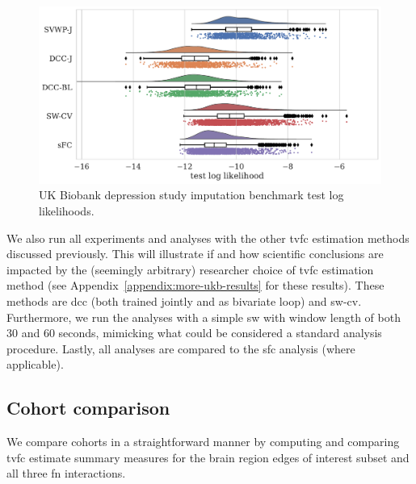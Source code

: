 \begin{figure}[ht]
  \centering
  \includegraphics[width=\textwidth]{fig/ukbiobank/imputation_study/ROI/LEOO_test_log_likelihoods_raincloud}
  \caption{
    UK Biobank depression study imputation benchmark test log likelihoods.
  }
  \label{fig:ukb-imputation-benchmark}
\end{figure}


We also run all experiments and analyses with the other \gls{tvfc} estimation methods discussed previously.
This will illustrate if and how scientific conclusions are impacted by the (seemingly arbitrary) researcher choice of \gls{tvfc} estimation method (see Appendix~\ref{appendix:more-ukb-results} for these results).
These methods are \gls{dcc} (both trained jointly and as bivariate loop) and \gls{sw-cv}.
Furthermore, we run the analyses with a simple \gls{sw} with window length of both 30 and 60 seconds, mimicking what could be considered a standard analysis procedure.
Lastly, all analyses are compared to the \gls{sfc} analysis (where applicable).

\subsection{Cohort comparison}

We compare cohorts in a straightforward manner by computing and comparing \gls{tvfc} estimate summary measures for the brain region edges of interest subset and all three \gls{fn} interactions.

